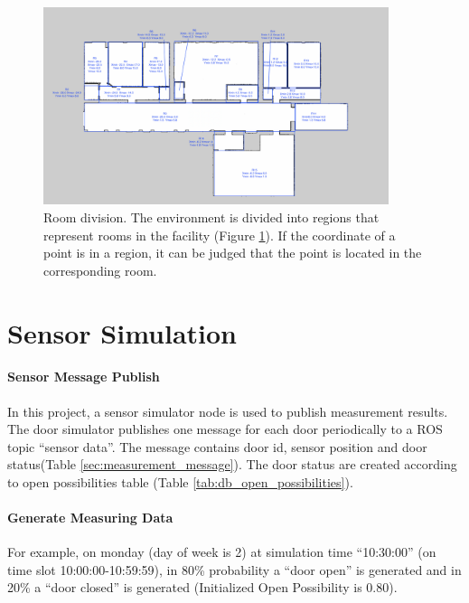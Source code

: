 \begin{figure}[htbp]
	\centering
	\includegraphics[width = 0.9\textwidth]{content/images/ch3/room_division.png}
	\caption{Room division. The environment is divided into regions that represent rooms in the facility (Figure \ref{fig:room_division}). If the coordinate of a point is in a region, it can be judged that the point is located in the corresponding room.}
    \label{fig:room_division}
\end{figure}

\section{Sensor Simulation}
\label{sec:sensor_simulatior}

\paragraph{Sensor Message Publish}
In this project, a sensor simulator node is used to publish measurement results. The door simulator publishes one message for each door periodically to a ROS topic ``sensor data''. The message contains door id, sensor position and door status(Table \ref{sec:measurement_message}). The door status are created according to open possibilities table (Table \ref{tab:db_open_possibilities}). 


\paragraph{Generate Measuring Data}
For example, on monday (day of week is 2) at simulation time ``10:30:00'' (on time slot 10:00:00-10:59:59), in 80\% probability a ``door open'' is generated and in 20\% a ``door closed'' is generated (Initialized Open Possibility is 0.80).


